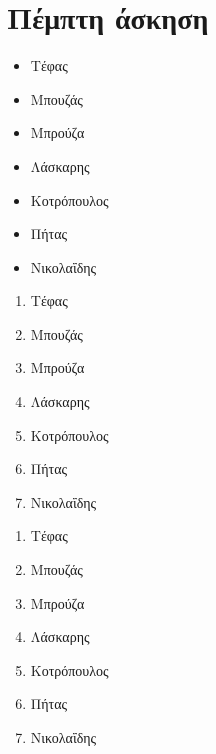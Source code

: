 \documentclass[a4paper,11pt]{article}
\begin{document}
\section{Πέμπτη άσκηση}
\begin{itemize}
   \item Τέφας
   \item Μπουζάς
   \item Μπρούζα
   \item Λάσκαρης
   \item Κοτρόπουλος
   \item Πήτας
   \item Νικολαΐδης
\end{itemize}

\begin{enumerate}
   \item Τέφας
   \item Μπουζάς
   \item Μπρούζα
   \item Λάσκαρης
   \item Κοτρόπουλος
   \item Πήτας
   \item Νικολαΐδης
\end{enumerate}
\begin{enumerate}[label=\textbf{(\greek*)}]
   \item Τέφας
   \item Μπουζάς
   \item Μπρούζα
   \item Λάσκαρης
   \item Κοτρόπουλος
   \item Πήτας
   \item Νικολαΐδης
\end{enumerate}
\end{document}
